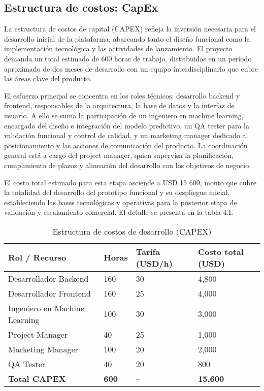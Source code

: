 \subsection{Estructura de costos: CapEx}
La estructura de costos de capital (CAPEX) refleja la inversión necesaria para el desarrollo inicial de la plataforma, abarcando tanto el diseño funcional como la implementación tecnológica y las actividades de lanzamiento. El proyecto demanda un total estimado de 600 horas de trabajo, distribuidas en un período aproximado de dos meses de desarrollo con un equipo interdisciplinario que cubre las áreas clave del producto.

El esfuerzo principal se concentra en los roles técnicos: desarrollo backend y frontend, responsables de la arquitectura, la base de datos y la interfaz de usuario. A ello se suma la participación de un ingeniero en machine learning, encargado del diseño e integración del modelo predictivo, un QA tester para la validación funcional y control de calidad, y un marketing manager dedicado al posicionamiento y las acciones de comunicación del producto. La coordinación general está a cargo del project manager, quien supervisa la planificación, cumplimiento de plazos y alineación del desarrollo con los objetivos de negocio.

El costo total estimado para esta etapa asciende a USD 15 600, monto que cubre la totalidad del desarrollo del prototipo funcional y su despliegue inicial, estableciendo las bases tecnológicas y operativas para la posterior etapa de validación y escalamiento comercial. El detalle se presenta en la tabla 4.I.

\begin{table}[t]
    \centering
    \renewcommand{\arraystretch}{1.3}
    \caption{Estructura de costos de desarrollo (CAPEX)}
    \label{tab:capex}
    \begin{tabular}{|p{4.5cm}|p{2.2cm}|p{2.5cm}|p{2.5cm}|}
        \hline
        \textbf{Rol / Recurso} & \textbf{Horas} & \textbf{Tarifa (USD/h)} & \textbf{Costo total (USD)} \\
        \hline
        Desarrollador Backend & 160 & 30 & 4,800 \\
        \hline
        Desarrollador Frontend & 160 & 25 & 4,000 \\
        \hline
        Ingeniero en Machine Learning & 100 & 30 & 3,000 \\
        \hline
        Project Manager & 40 & 25 & 1,000 \\
        \hline
        Marketing Manager & 100 & 20 & 2,000 \\
        \hline
        QA Tester & 40 & 20 & 800 \\
        \hline
        \textbf{Total CAPEX} & \textbf{600} & -- & \textbf{15,600} \\
        \hline
    \end{tabular}
\end{table}



